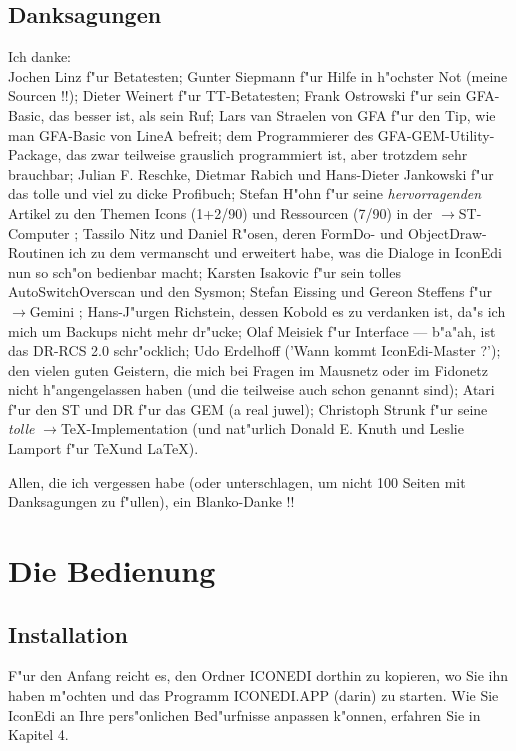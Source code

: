 \section{Danksagungen} 
Ich danke: \\
Jochen Linz f"ur Betatesten; 
Gunter Siepmann f"ur Hilfe in h"ochster Not (meine Sourcen !!); 
Dieter Weinert f"ur TT-Betatesten;
Frank Ostrowski f"ur sein GFA-Basic, das besser ist, als sein Ruf; 
Lars van Straelen von GFA f"ur den Tip, wie man GFA-Basic von 
LineA befreit; 
dem Programmierer des GFA-GEM-Utility-Package,
das zwar teilweise grauslich programmiert ist, 
aber trotzdem sehr brauchbar; 
Julian F. Reschke, Dietmar Rabich und Hans-Dieter Jankowski f"ur 
das tolle und viel zu dicke Profibuch;
Stefan H"ohn f"ur seine {\sl hervorragenden} Artikel zu den Themen 
Icons (1+2/90) und Ressourcen (7/90) in der $\to$ST-Computer
; 
Tassilo Nitz und Daniel R"osen, deren FormDo- und 
ObjectDraw-Routinen ich zu dem vermanscht und erweitert habe, 
was die Dialoge in IconEdi nun so sch"on bedienbar macht; 
Karsten Isakovic f"ur sein tolles AutoSwitchOverscan
und den Sysmon;
Stefan Eissing und Gereon Steffens f"ur $\to$Gemini 
; 
Hans-J"urgen Richstein, dessen Kobold
es zu verdanken ist, da"s ich mich um Backups nicht mehr dr"ucke;  
Olaf Meisiek f"ur Interface
--- b"a"ah, ist das DR-RCS 2.0 schr"ocklich; 
Udo Erdelhoff ('Wann kommt IconEdi-Master ?'); 
den vielen guten Geistern, die mich bei Fragen im Mausnetz oder 
im Fidonetz nicht h"angengelassen haben (und die teilweise auch 
schon genannt sind); 
Atari f"ur den ST und DR f"ur das GEM (a real juwel); 
Christoph Strunk f"ur seine {\sl tolle}  $\to$\TeX-Implementation
\glossary{\TeX} (und nat"urlich Donald E. Knuth und Leslie Lamport
f"ur \TeX und \LaTeX). 

Allen, die ich vergessen habe (oder unterschlagen, um nicht 100
Seiten mit Danksagungen zu f"ullen), ein Blanko-Danke !!


%
\chapter{Die Bedienung} 

\section{Installation} 
F"ur den Anfang reicht es, den Ordner ICONEDI dorthin zu kopieren, 
wo Sie ihn haben m"ochten und das Programm ICONEDI.APP (darin) zu 
starten. Wie Sie IconEdi an Ihre pers"onlichen Bed"urfnisse anpassen 
k"onnen, erfahren Sie in Kapitel 4.

